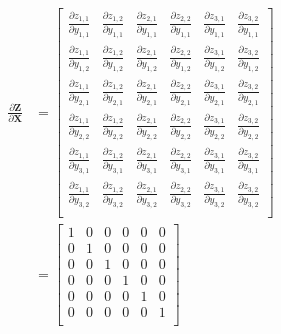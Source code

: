 \documentclass{article}
\newcommand{\matr}[1]{\mathbf{#1}} %
\begin{document}
\begin{align}
\frac{\partial \matr{Z}}{\partial \matr{X}} &=
\begin{bmatrix}
\frac{\partial z_{1,1}}{\partial y_{1,1}} & \frac{\partial z_{1,2}}{\partial y_{1,1}} & \frac{\partial z_{2,1}}{\partial y_{1,1}} & \frac{\partial z_{2,2}}{\partial y_{1,1}} & \frac{\partial z_{3,1}}{\partial y_{1,1}} & \frac{\partial z_{3,2}}{\partial y_{1,1}}\\[0.7em]
\frac{\partial z_{1,1}}{\partial y_{1,2}} & \frac{\partial z_{1,2}}{\partial y_{1,2}} & \frac{\partial z_{2,1}}{\partial y_{1,2}} & \frac{\partial z_{2,2}}{\partial y_{1,2}} & \frac{\partial z_{3,1}}{\partial y_{1,2}} & \frac{\partial z_{3,2}}{\partial y_{1,2}}\\[0.7em]
\frac{\partial z_{1,1}}{\partial y_{2,1}} & \frac{\partial z_{1,2}}{\partial y_{2,1}} & \frac{\partial z_{2,1}}{\partial y_{2,1}} & \frac{\partial z_{2,2}}{\partial y_{2,1}} & \frac{\partial z_{3,1}}{\partial y_{2,1}} & \frac{\partial z_{3,2}}{\partial y_{2,1}}\\[0.7em]
\frac{\partial z_{1,1}}{\partial y_{2,2}} & \frac{\partial z_{1,2}}{\partial y_{2,2}} & \frac{\partial z_{2,1}}{\partial y_{2,2}} & \frac{\partial z_{2,2}}{\partial y_{2,2}} & \frac{\partial z_{3,1}}{\partial y_{2,2}} & \frac{\partial z_{3,2}}{\partial y_{2,2}}\\[0.7em]
\frac{\partial z_{1,1}}{\partial y_{3,1}} & \frac{\partial z_{1,2}}{\partial y_{3,1}} & \frac{\partial z_{2,1}}{\partial y_{3,1}} & \frac{\partial z_{2,2}}{\partial y_{3,1}} & \frac{\partial z_{3,1}}{\partial y_{3,1}} & \frac{\partial z_{3,2}}{\partial y_{3,1}}\\[0.7em]
\frac{\partial z_{1,1}}{\partial y_{3,2}} & \frac{\partial z_{1,2}}{\partial y_{3,2}} & \frac{\partial z_{2,1}}{\partial y_{3,2}} & \frac{\partial z_{2,2}}{\partial y_{3,2}} & \frac{\partial z_{3,1}}{\partial y_{3,2}} & \frac{\partial z_{3,2}}{\partial y_{3,2}}\\[0.7em]
\end{bmatrix} \nonumber
\\ \label{dZbydY_matrix_addition}
&=
\begin{bmatrix}
1 & 0 & 0 & 0 & 0 & 0 \\%
0 & 1 & 0 & 0 & 0 & 0 \\%
0 & 0 & 1 & 0 & 0 & 0 \\%
0 & 0 & 0 & 1 & 0 & 0 \\%
0 & 0 & 0 & 0 & 1 & 0 \\%
0 & 0 & 0 & 0 & 0 & 1 \\%
\end{bmatrix}
\end{align}
\end{document}
